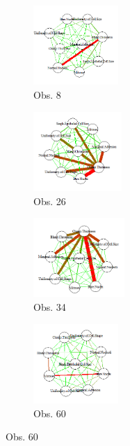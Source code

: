 \begin{figure}[htbp!]
	\begin{center}
		\begin{subfigure}[t]{0.2\textwidth}
			\centering
			\includegraphics[height=3cm]{imagenes/cancer/b1.png}
			\caption{Obs. 8}
		\end{subfigure}
		\begin{subfigure}[t]{0.2\textwidth}
			\centering
			\includegraphics[height=3cm]{imagenes/cancer/b2.png}
			\caption{Obs. 26}
		\end{subfigure}
		\begin{subfigure}[t]{0.2\textwidth}
			\centering
			\includegraphics[height=3cm]{imagenes/cancer/b3.png}
			\caption{Obs. 34}
		\end{subfigure}
		\begin{subfigure}[t]{0.2\textwidth}
			\centering
			\includegraphics[height=3cm]{imagenes/cancer/b4.png}
			\caption{Obs. 60}
		\end{subfigure}	
		

\end{center}
\end{figure}
